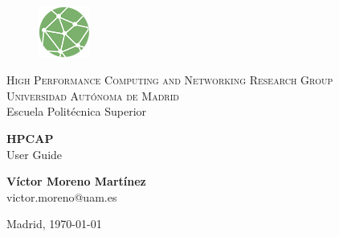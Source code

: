\begin{titlepage}

\begin{doublespace}
\begin{figure}[!ht]
\centering
\includegraphics[width=0.15\textwidth]{figs/hpcn_logo.png}
\end{figure}
\vspace{-5pt}
\begin{center}
{\Large \textsc{High Performance Computing and Networking Research Group\\
Universidad Aut\'onoma de Madrid}} \\
{\large Escuela Polit\'ecnica Superior}\end{center}
\end{doublespace}

\vspace{1cm}


\begin{center}
\textbf{\LARGE HPCAP}\\
{\large User Guide}
\end{center}

\vfill{}

\begin{center}
{\Large\bf V\'ictor Moreno Mart\'inez}\\
{\large victor.moreno@uam.es}\\
\end{center}

\begin{center}
{\large Madrid, \today}
\end{center}

\end{titlepage}

